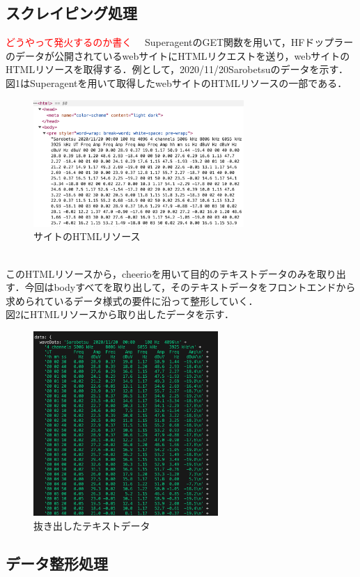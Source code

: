 \subsection{スクレイピング処理}
\textcolor{red}{どうやって発火するのか書く}
　SuperagentのGET関数を用いて，HFドップラーのデータが公開されているwebサイト\cite{hfd_link}にHTMLリクエストを送り，webサイトのHTMLリソースを取得する．例として，2020/11/20Sarobetsuのデータを示す．図1はSuperagentを用いて取得したwebサイトのHTMLリソースの一部である．\\
\begin{figure}[h]
  \centering
  \caption{サイトのHTMLリソース}
  \includegraphics[width=80mm]{fig/htmlRes.png}
\end{figure}\\
このHTMLリソースから，cheerioを用いて目的のテキストデータのみを取り出す．今回はbodyすべてを取り出して，そのテキストデータをフロントエンドから求められているデータ様式の要件に沿って整形していく．\\
図2にHTMLリソースから取り出したデータを示す．
\begin{figure}[h]
   \centering
   \caption{抜き出したテキストデータ}
   \includegraphics[width=70mm]{fig/textData.png}
\end{figure}

\subsection{データ整形処理}
